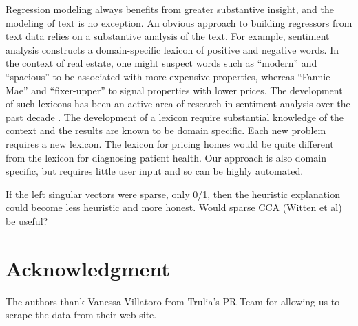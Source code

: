 \documentclass[12pt]{article}\usepackage[]{graphicx}\usepackage[]{color}
\begin{document}
  Regression modeling always benefits from greater substantive
 insight, and the modeling of text is no exception.  An obvious
 approach to building regressors from text data relies on a
 substantive analysis of the text.  For example, sentiment analysis
 constructs a domain-specific lexicon of positive and negative words.
  In the context of real estate, one might suspect words such as
 ``modern'' and ``spacious'' to be associated with more expensive
 properties, whereas ``Fannie Mae'' and ``fixer-upper'' to signal
 properties with lower prices.  The development of such lexicons has
 been an active area of research in sentiment analysis over the past
 decade \citep{taboada11}.  The development of a lexicon require
 substantial knowledge of the context and the results are known to be
 domain specific.  Each new problem requires a new lexicon.  The
 lexicon for pricing homes would be quite different from the lexicon
 for diagnosing patient health.  Our approach is also domain specific,
 but requires little user input and so can be highly automated.


  If the left singular vectors were sparse, only 0/1, then the
 heuristic explanation could become less heuristic and more honest.
  Would sparse CCA (Witten et al) be useful? \citet{witten09}


\section*{Acknowledgment}

 The authors thank Vanessa Villatoro from Trulia's PR Team for
 allowing us to scrape the data from their web site.




\end{document}

